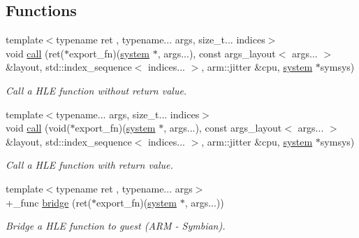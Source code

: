 \subsection*{Functions}
\begin{DoxyCompactItemize}
\item 
\mbox{\label{namespaceeka2l1_1_1hle_a7db2075403bf249023cade130e01bb7b}} 
{\footnotesize template$<$typename ret , typename... args, size\+\_\+t... indices$>$ }\\void \mbox{\hyperlink{namespaceeka2l1_1_1hle_a7db2075403bf249023cade130e01bb7b}{call}} (ret($\ast$export\+\_\+fn)(\mbox{\hyperlink{classeka2l1_1_1system}{system}} $\ast$, args...), const args\+\_\+layout$<$ args... $>$ \&layout, std\+::index\+\_\+sequence$<$ indices... $>$, arm\+::jitter \&cpu, \mbox{\hyperlink{classeka2l1_1_1system}{system}} $\ast$symsys)
\begin{DoxyCompactList}\small\item\em Call a H\+LE function without return value. \end{DoxyCompactList}\item 
\mbox{\label{namespaceeka2l1_1_1hle_af3f6dd5c791aea6b219bac8ab1cd1379}} 
{\footnotesize template$<$typename... args, size\+\_\+t... indices$>$ }\\void \mbox{\hyperlink{namespaceeka2l1_1_1hle_af3f6dd5c791aea6b219bac8ab1cd1379}{call}} (void($\ast$export\+\_\+fn)(\mbox{\hyperlink{classeka2l1_1_1system}{system}} $\ast$, args...), const args\+\_\+layout$<$ args... $>$ \&layout, std\+::index\+\_\+sequence$<$ indices... $>$, arm\+::jitter \&cpu, \mbox{\hyperlink{classeka2l1_1_1system}{system}} $\ast$symsys)
\begin{DoxyCompactList}\small\item\em Call a H\+LE function with return value. \end{DoxyCompactList}\item 
\mbox{\label{namespaceeka2l1_1_1hle_a2dc5f180b308b1fe7e164ef49c738983}} 
{\footnotesize template$<$typename ret , typename... args$>$ }\\+\_\+func \mbox{\hyperlink{namespaceeka2l1_1_1hle_a2dc5f180b308b1fe7e164ef49c738983}{bridge}} (ret($\ast$export\+\_\+fn)(\mbox{\hyperlink{classeka2l1_1_1system}{system}} $\ast$, args...))
\begin{DoxyCompactList}\small\item\em Bridge a H\+LE function to guest (A\+RM -\/ Symbian). \end{DoxyCompactList}\item 

\end{DoxyCompactItemize}
